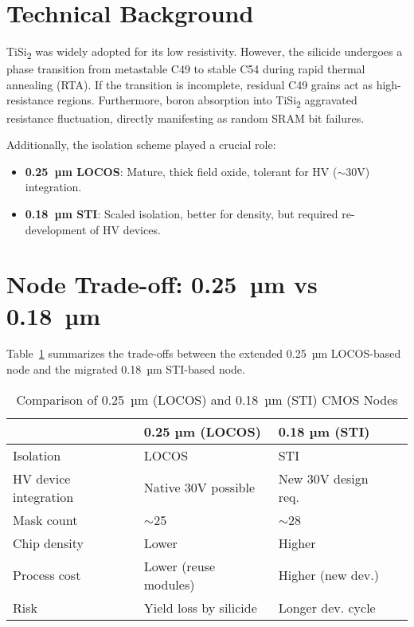 \documentclass[conference]{IEEEtran}
\begin{document}
\section{Technical Background}
TiSi\textsubscript{2} was widely adopted for its low resistivity. 
However, the silicide undergoes a phase transition from metastable C49 to stable C54 during rapid thermal annealing (RTA). 
If the transition is incomplete, residual C49 grains act as high-resistance regions. 
Furthermore, boron absorption into TiSi\textsubscript{2} aggravated resistance fluctuation, directly manifesting as random SRAM bit failures. 

Additionally, the isolation scheme played a crucial role:  
\begin{itemize}
  \item \textbf{0.25~µm LOCOS}: Mature, thick field oxide, tolerant for HV ($\sim$30V) integration.  
  \item \textbf{0.18~µm STI}: Scaled isolation, better for density, but required re-development of HV devices.  
\end{itemize}

\section{Node Trade-off: 0.25~µm vs 0.18~µm}
Table~\ref{tab:node} summarizes the trade-offs between the extended 0.25~µm LOCOS-based node and the migrated 0.18~µm STI-based node.

\begin{table}[!t]
\centering
\caption{Comparison of 0.25~µm (LOCOS) and 0.18~µm (STI) CMOS Nodes}
\label{tab:node}
\begin{tabular}{@{}llll@{}}
\toprule
 & \textbf{0.25 µm (LOCOS)} & \textbf{0.18 µm (STI)} \\
\midrule
Isolation & LOCOS & STI \\
HV device integration & Native 30V possible & New 30V design req. \\
Mask count & $\sim$25 & $\sim$28 \\
Chip density & Lower & Higher \\
Process cost & Lower (reuse modules) & Higher (new dev.) \\
Risk & Yield loss by silicide & Longer dev. cycle \\
\bottomrule
\end{tabular}
\end{table}
\end{document}
